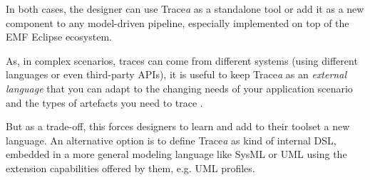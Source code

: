 In both cases, the designer can use Trace\textit{a} as a standalone tool or add it as a new component to any model-driven pipeline, especially implemented on top of the EMF Eclipse ecosystem. 

As, in complex scenarios, traces can come from different systems (using different languages or even third-party APIs), it is useful to keep Trace\textit{a} as an \textit{external language} that you can adapt to the changing needs of your application scenario and the types of artefacts you need to trace  \cite{clelandhuang2007bestPracticeForAutomatedTraceability,maro2016_maintenance_factors_and_guidelines}. 

But as a trade-off, this forces designers to learn and add to their toolset a new language. An alternative option is to define Trace\textit{a} as kind of internal DSL, embedded in a more general modeling language like SysML or UML using the extension capabilities offered by them, e.g. UML profiles. 
 

